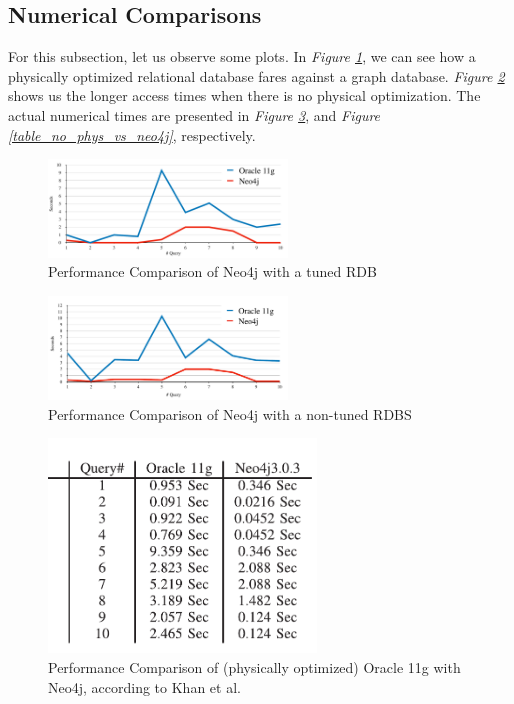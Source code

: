 \documentclass[10pt,        %
               a4paper,     %
               journal,     %
               ]{IEEEtran}
\begin{document}
\subsection{Numerical Comparisons}
For this subsection, let us observe some plots. In \textit{Figure \ref{graph_phys_vs_neo4j}}, we can see how a physically optimized relational database fares against a graph database. \textit{Figure \ref{graph_no_phys_vs_neo4j}} shows us the longer access times when there is no physical optimization. The actual numerical times are presented in \textit{Figure \ref{table_phys_vs_neo4j}}, and \textit{Figure \ref{table_no_phys_vs_neo4j}}, respectively. \par
\begin{figure}[!t]
	\centering
	\includegraphics[width=2.5in]{plots/phys_vs_neo4j}
	\caption{Performance Comparison of Neo4j with a tuned RDB \cite{IEEEpaper1:comparison}}
	\label{graph_phys_vs_neo4j}
\end{figure}

\begin{figure}[!t]
	\centering
	\includegraphics[width=2.5in]{plots/no phys vs neo4j}
	\caption{Performance Comparison of Neo4j with a non-tuned RDBS \cite{IEEEpaper1:comparison}}
	\label{graph_no_phys_vs_neo4j}
\end{figure}


\begin{figure}[!t]
	\centering
	\includegraphics[width=2.8in]{plots/phys vs neo4j table}
	\caption{Performance Comparison of (physically optimized) Oracle 11g with Neo4j, according to Khan et al. \cite{IEEEpaper1:comparison}}
	\label{table_phys_vs_neo4j}
\end{figure}
\end{document}
